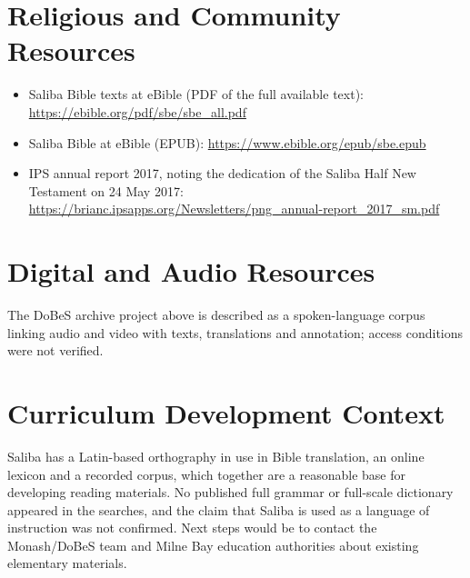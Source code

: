 \documentclass[12pt]{article}
\begin{document}
\section{Religious and Community Resources}
\begin{itemize}
\item Saliba Bible texts at eBible (PDF of the full available text): \url{https://ebible.org/pdf/sbe/sbe_all.pdf}
\item Saliba Bible at eBible (EPUB): \url{https://www.ebible.org/epub/sbe.epub}
\item IPS annual report 2017, noting the dedication of the Saliba Half New Testament on 24 May 2017: \url{https://brianc.ipsapps.org/Newsletters/png_annual-report_2017_sm.pdf}
\end{itemize}

\section{Digital and Audio Resources}
The DoBeS archive project above is described as a spoken-language corpus linking audio and video with texts, translations and annotation; access conditions were not verified.

\section{Curriculum Development Context}
Saliba has a Latin-based orthography in use in Bible translation, an online lexicon and a recorded corpus, which together are a reasonable base for developing reading materials. No published full grammar or full-scale dictionary appeared in the searches, and the claim that Saliba is used as a language of instruction was not confirmed. Next steps would be to contact the Monash/DoBeS team and Milne Bay education authorities about existing elementary materials.
\end{document}
